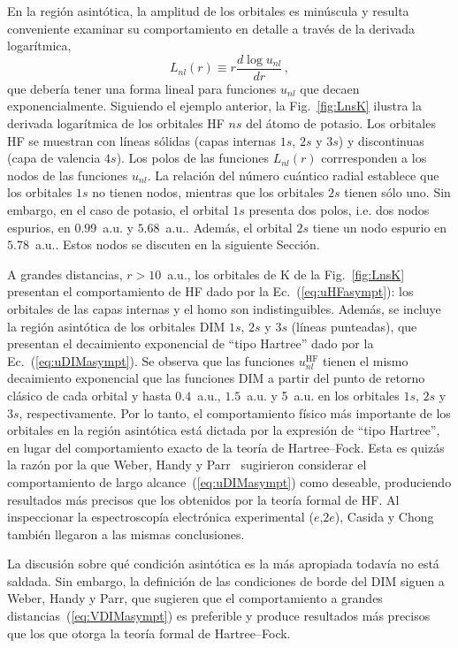 En la región asintótica, la amplitud de los orbitales es minúscula y 
resulta conveniente examinar su comportamiento en detalle a través de la 
derivada logarítmica, 
\begin{equation}
L_{nl}(r) \equiv r \frac{d \log{u_{nl}}}{d r}\,,
\label{eq:Lnl}
\end{equation}
que debería tener una forma lineal para funciones $u_{nl}$ que decaen 
exponencialmente. Siguiendo el ejemplo anterior, la Fig.~\ref{fig:LnsK} 
ilustra la derivada logarítmica de los orbitales HF $ns$ del átomo de 
potasio. Los orbitales HF se muestran con líneas sólidas (capas internas 
$1s$, $2s$ y $3s$) y discontinuas (capa de valencia $4s$). Los polos de 
las funciones $L_{nl}(r)$ corrresponden a los nodos de las funciones 
$u_{nl}$. La relación del número cuántico radial establece que 
los orbitales $1s$ no tienen nodos, mientras que los orbitales $2s$ 
tienen sólo uno. Sin embargo, en el caso de potasio, el orbital $1s$ 
presenta dos polos, i.e. dos nodos espurios, en $0.99$~a.u. y 
$5.68$~a.u.. Además, el orbital $2s$ tiene un nodo espurio en 
$5.78$~a.u.. Estos nodos se discuten en la siguiente Sección.

A grandes distancias, $r>10$~a.u., los orbitales de K de la 
Fig.~\ref{fig:LnsK} presentan el comportamiento de HF dado por la 
Ec.~(\ref{eq:uHFasympt}): los orbitales de las capas internas y el 
\acs{homo} son indistinguibles. Además, se incluye la región asintótica 
de los orbitales DIM $1s$, $2s$ y $3s$ (líneas punteadas), que presentan 
el decaimiento exponencial de ``tipo Hartree'' dado por la 
Ec.~(\ref{eq:uDIMasympt}). Se observa que las funciones 
$u_{nl}^{\mathrm{HF}}$ tienen el mismo decaimiento exponencial que las 
funciones DIM a partir del punto de retorno clásico de cada orbital y 
hasta $0.4$~a.u., $1.5$~a.u. y 5~a.u. en los orbitales $1s$, $2s$ y 
$3s$, respectivamente. Por lo tanto, el comportamiento físico más 
importante de los orbitales en la región asintótica está dictada por la 
expresión de ``tipo Hartree'', en lugar del comportamiento exacto de la 
teoría de Hartree--Fock. Esta es quizás la razón por la que Weber, Handy 
y Parr~\cite{Weber:70} sugirieron considerar el comportamiento de largo 
alcance~(\ref{eq:uDIMasympt}) como deseable, produciendo resultados más 
precisos que los obtenidos por la teoría formal de HF. Al inspeccionar 
la espectroscopía electrónica experimental ($e$,$2e$), Casida y 
Chong~\cite{Casida:89} también llegaron a las mismas conclusiones. 

La discusión sobre qué condición asintótica es la más apropiada todavía 
no está saldada. Sin embargo, la definición de las condiciones de borde 
del DIM siguen a Weber, Handy y Parr, que sugieren que el comportamiento 
a grandes distancias~(\ref{eq:VDIMasympt}) es preferible y produce 
resultados más precisos que los que otorga la teoría formal de 
Hartree--Fock. 

